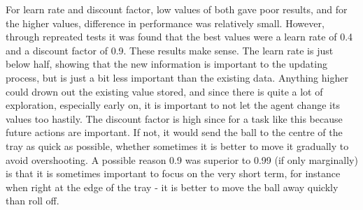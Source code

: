 \documentclass[12pt,a4paper]{article}
\begin{document}
For learn rate and discount factor, low values of both gave poor results, and for the higher values, difference in performance was relatively small. However, through repreated tests it was found that the best values were a learn rate of 0.4 and a discount factor of 0.9. These results make sense. The learn rate is just below half, showing that the new information is important to the updating process, but is just a bit less important than the existing data. Anything higher could drown out the existing value stored, and since there is quite a lot of exploration, especially early on, it is important to not let the agent change its values too hastily. The discount factor is high since for a task like this because future actions are important. If not, it would send the ball to the centre of the tray as quick as possible, whether sometimes it is better to move it gradually to avoid overshooting. A possible reason 0.9 was superior to 0.99 (if only marginally) is that it is sometimes important to focus on the very short term, for instance when right at the edge of the tray - it is better to move the ball away quickly than roll off.
\end{document}

